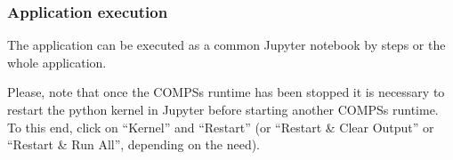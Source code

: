 \subsubsection{Application execution}

The application can be executed as a common Jupyter notebook by steps or the whole application.

Please, note that once the COMPSs runtime has been stopped it is necessary to restart the python kernel in Jupyter before starting another COMPSs runtime.
To this end, click on ``Kernel'' and ``Restart'' (or ``Restart \& Clear Output'' or ``Restart \& Run All'', depending on the need).